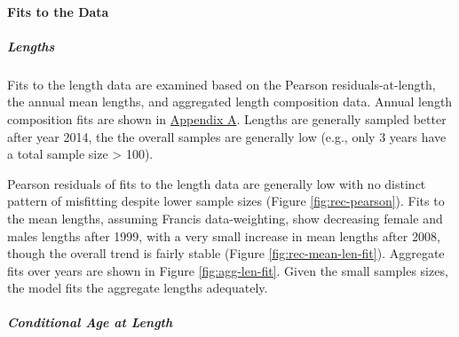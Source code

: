 \documentclass[11pt,
  english,
  a4paper,
]{article}
\begin{document}
\leavevmode\tagmcend\tagstructend\par


\hypertarget{fits-to-the-data}{%
\paragraph{Fits to the Data}\label{fits-to-the-data}}

\leavevmode\tagmcend\tagstructend


\hypertarget{lengths-1}{%
\subparagraph{Lengths}\label{lengths-1}}

\leavevmode\tagmcend\tagstructend


Fits to the length data are examined based on the Pearson residuals-at-length, the annual mean lengths, and aggregated length composition data. Annual length composition fits are shown in {\protect\hyperlink{app_a}{Appendix A}\leavevmode\tagmcend\tagstructend}. Lengths are generally sampled better after year 2014, the the overall samples are generally low (e.g., only 3 years have a total sample size \textgreater{} 100).

\leavevmode\tagmcend\tagstructend\par


Pearson residuals of fits to the length data are generally low with no distinct pattern of misfitting despite lower sample sizes (Figure \ref{fig:rec-pearson}). Fits to the mean lengths, assuming Francis data-weighting, show decreasing female and males lengths after 1999, with a very small increase in mean lengths after 2008, though the overall trend is fairly stable (Figure \ref{fig:rec-mean-len-fit}). Aggregate fits over years are shown in Figure \ref{fig:agg-len-fit}. Given the small samples sizes, the model fits the aggregate lengths adequately.

\leavevmode\tagmcend\tagstructend\par


\hypertarget{conditional-age-at-length}{%
\subparagraph{Conditional Age at Length}\label{conditional-age-at-length}}

\leavevmode\tagmcend\tagstructend
\end{document}
